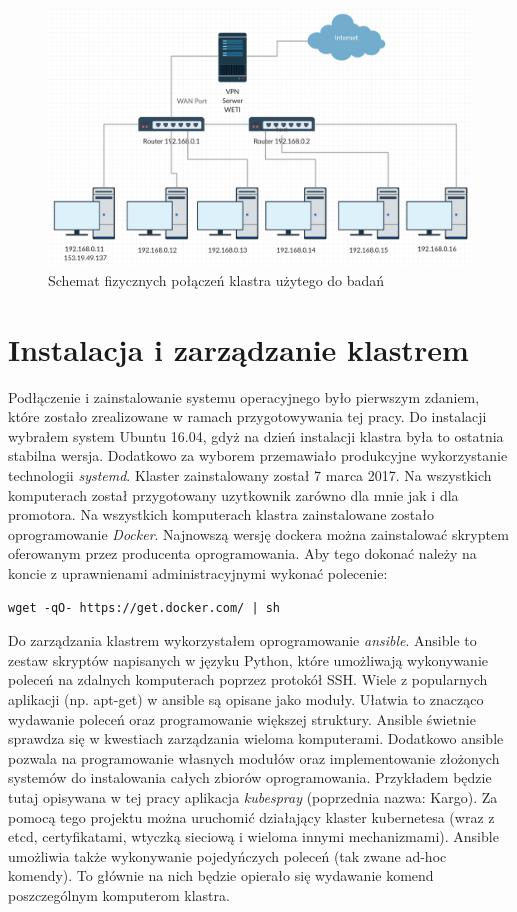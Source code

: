 \documentclass[10pt,a4paper,titlepage,twoside]{report}
\begin{document}
\begin{figure}[ht!]
	\centering
	\includegraphics[scale=0.4]{pics/cluster-architecture.png}
	\caption{Schemat fizycznych połączeń klastra użytego do badań}
	\label{cluster_architecture}
\end{figure}

\section{Instalacja i zarządzanie klastrem}

Podłączenie i zainstalowanie systemu operacyjnego było pierwszym zdaniem, które zostało zrealizowane w ramach przygotowywania tej pracy. Do instalacji wybrałem system Ubuntu 16.04, gdyż na dzień instalacji klastra była to ostatnia stabilna wersja. Dodatkowo za wyborem przemawiało produkcyjne wykorzystanie technologii \textit{systemd}. Klaster zainstalowany został 7 marca 2017. Na wszystkich komputerach został przygotowany uzytkownik zarówno dla mnie jak i dla promotora. Na wszystkich komputerach klastra zainstalowane zostało oprogramowanie \textit{Docker}. Najnowszą wersję dockera można zainstalować skryptem oferowanym przez producenta oprogramowania. Aby tego dokonać należy na koncie z uprawnienami administracyjnymi wykonać polecenie:

\begin{lstlisting}
wget -qO- https://get.docker.com/ | sh
\end{lstlisting}

Do zarządzania klastrem wykorzystałem oprogramowanie \textit{ansible}. Ansible to zestaw skryptów napisanych w języku Python, które umożliwają wykonywanie poleceń na zdalnych komputerach poprzez protokół SSH. Wiele z popularnych aplikacji (np. apt-get) w ansible są opisane jako moduły. Ułatwia to znacząco wydawanie poleceń oraz programowanie większej struktury. Ansible świetnie sprawdza się w kwestiach zarządzania wieloma komputerami. Dodatkowo ansible pozwala na programowanie własnych modułów oraz implementowanie złożonych systemów do instalowania całych zbiorów oprogramowania. Przykładem będzie tutaj opisywana w tej pracy aplikacja \textit{kubespray} (poprzednia nazwa: Kargo). Za pomocą tego projektu można uruchomić działający klaster kubernetesa (wraz z etcd, certyfikatami, wtyczką sieciową i wieloma innymi mechanizmami). Ansible umożliwia także wykonywanie pojedyńczych poleceń (tak zwane ad-hoc komendy). To głównie na nich będzie opierało się wydawanie komend poszczególnym komputerom klastra. 
\end{document}
